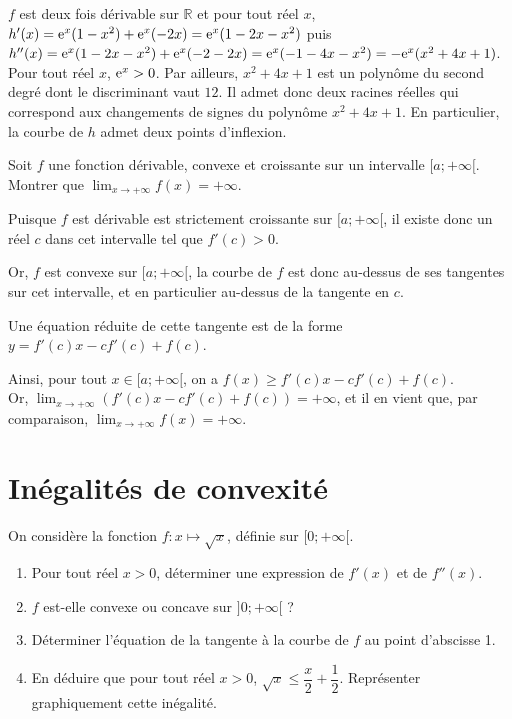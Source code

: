 \documentclass[11pt,fleqn, openany]{book} %
\begin{document}
\begin{solution}$f$ est deux fois dérivable sur $\mathbb{R}$ et pour tout réel $x$, $h'(x)=\mathrm{e}^x(1-x^2)+\mathrm{e}^x(-2x)=\mathrm{e}^x(1-2x-x^2)$ puis $h''(x)=\mathrm{e}^x(1-2x-x^2)+\mathrm{e}^x(-2-2x)=\mathrm{e}^x(-1-4x-x^2)=-\mathrm{e}^x(x^2+4x+1)$. Pour tout réel $x$, $\mathrm{e}^x>0$. Par ailleurs, $x^2+4x+1$ est un polynôme du second degré dont le discriminant vaut $12$. Il admet donc deux racines réelles qui correspond aux changements de signes du polynôme $x^2+4x+1$. En particulier, la courbe de $h$ admet deux points d'inflexion.\end{solution}



\begin{exercise}Soit $f$ une fonction dérivable, convexe et croissante sur un intervalle $[a;+\infty[$. \\Montrer que $\displaystyle\lim_{x \to + \infty}f(x)=+\infty$.\newpage \end{exercise}

\begin{solution}
Puisque \(f\) est dérivable est strictement croissante sur \([a;+\infty[\), il existe donc un réel \(c\) dans cet intervalle tel que \(f'(c)>0\).

 Or, \(f\) est convexe sur \([a;+\infty[\), la courbe de \(f\) est donc au-dessus de ses tangentes sur cet intervalle, et en particulier au-dessus de la tangente en \(c\). 

 Une équation réduite de cette tangente est de la forme \(y = f'(c)x -cf'(c)+f(c)\). 

 Ainsi, pour tout \(x \in [a;+\infty[\), on a \(f(x) \geqslant f'(c)x -cf'(c)+f(c)\). \\Or, \(\displaystyle\lim_{x\to +\infty}(f'(c)x -cf'(c)+f(c))=+\infty\), et il en vient que, par comparaison, \(\displaystyle\lim_{x \to + \infty}f(x)=+\infty\).\end{solution}
 
 

 
\section*{Inégalités de convexité}

\begin{exercise}On considère la fonction $f:x\mapsto \sqrt{x}$, définie sur $[0;+\infty [$.
\begin{enumerate}
\item Pour tout réel $x>0$, déterminer une expression de $f'(x)$ et de $f''(x)$.
\item $f$ est-elle convexe ou concave sur $]0;+\infty[$ ?
\item Déterminer l'équation de la tangente à la courbe de $f$ au point d'abscisse 1.
\item En déduire que pour tout réel $x>0$, $\sqrt{x} \leqslant \dfrac{x}{2}+\dfrac{1}{2}$. Représenter graphiquement cette inégalité.
\end{enumerate}\end{exercise}
\end{document}
